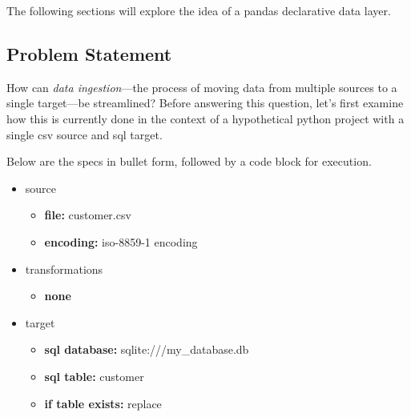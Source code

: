 The following sections will explore the idea of a pandas declarative
data layer.

\subsection{Problem Statement}\label{problem-statement}

How can \emph{data ingestion}---the process of moving data from multiple
sources to a single target---be streamlined? Before answering this
question, let's first examine how this is currently done in the context
of a hypothetical python project with a single csv source and sql
target.

Below are the specs in bullet form, followed by a code block for
execution.

\begin{itemize}
\tightlist
\item
  source

  \begin{itemize}
  \tightlist
  \item
    \textbf{file:} customer.csv
  \item
    \textbf{encoding:} iso-8859-1 encoding
  \end{itemize}
\item
  transformations

  \begin{itemize}
  \tightlist
  \item
    \textbf{none}
  \end{itemize}
\item
  target

  \begin{itemize}
  \tightlist
  \item
    \textbf{sql database:} sqlite:///my\_database.db
  \item
    \textbf{sql table:} customer
  \item
    \textbf{if table exists:} replace
  \end{itemize}
\end{itemize}

